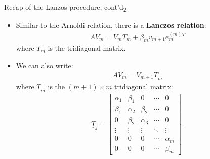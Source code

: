 \documentclass[t,usepdftitle=false]{beamer}
\begin{document}
\begin{frame}{Recap of the Lanzos procedure, cont'd\textsubscript{2}}
\begin{itemize}
\item Similar to the Arnoldi relation, there is a \textbf{Lanczos relation}:
\begin{align*}
AV_m=V_mT_m+\beta_mv_{m+1}e_m^{(m)}{}^T
\end{align*}
where $T_m$ is the tridiagonal matrix.
\item[] We can also write:
\begin{align*}
AV_m=V_{m+1}\underline{T}_m
\end{align*}
where $\underline{T}_m$ is the $(m+1) \times m$ tridiagonal matrix:
\begin{align*}
\underline{T}_j =
\begin{bmatrix}
\alpha_1 & \beta_1 & 0 & \cdots & 0 \\
\beta_1 & \alpha_2 & \beta_2 & \cdots & 0 \\
0 & \beta_2 & \alpha_3 & \cdots & 0 \\
\vdots & \vdots & \vdots & \ddots & \vdots \\
0 & 0 & 0 & \cdots & \alpha_m \\
0 & 0 & 0 & \cdots & \beta_m
\end{bmatrix}.
\end{align*}
\end{itemize}
\end{frame}
\end{document}
